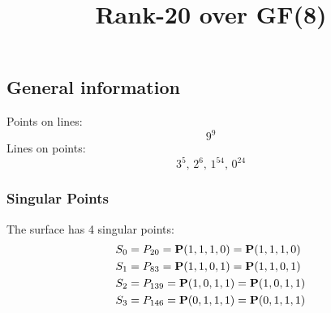 \documentclass{article}
\newcommand\setTBstruts{\def\T{\rule{0pt}{2.6ex}}%
\def\B{\rule[-1.2ex]{0pt}{0pt}}}
\newcommand{\bP}{{\bf P}}
\begin{document}
 
\setTBstruts



{\allowdisplaybreaks%






\title{Rank-20 over GF(8)}
\author{}%
\maketitle%
%
{}



\subsection*{General information}
Points on lines:
$$
9^9$$
Lines on points:
$$
3^5,\,2^6,\,1^{54},\,0^{24}$$
\subsubsection*{Singular Points}
The surface has 4 singular points:\\
\begin{align*}
S_{0} &= P_{20}=\bP(1, 1, 1, 0) = \bP(1, 1, 1, 0)\\
S_{1} &= P_{83}=\bP(1, 1, 0, 1) = \bP(1, 1, 0, 1)\\
S_{2} &= P_{139}=\bP(1, 0, 1, 1) = \bP(1, 0, 1, 1)\\
S_{3} &= P_{146}=\bP(0, 1, 1, 1) = \bP(0, 1, 1, 1)\\
\end{align*}
}
\end{document}
